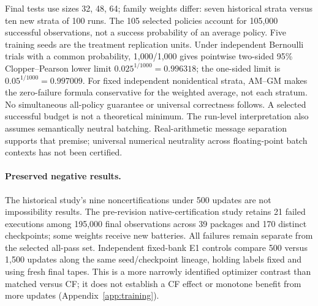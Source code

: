 \documentclass[10pt]{article}
\begin{document}
Final tests use sizes 32, 48, 64; family weights differ: seven historical
strata versus ten new strata of 100 runs. The 105 selected policies account
for 105,000 successful observations, not a success probability of an average
policy. Five training seeds are the treatment replication units.
Under independent Bernoulli trials with a common probability, 1,000/1,000
gives pointwise two-sided 95\% Clopper--Pearson lower limit \citep{clopper1934use}
$0.025^{1/1000}=0.996318$; the one-sided limit is
$0.05^{1/1000}=0.997009$. For fixed independent nonidentical strata, AM--GM
makes the zero-failure formula conservative for the weighted average, not
each stratum. No simultaneous all-policy guarantee or universal correctness
follows. A selected successful budget is not a theoretical minimum.
The run-level interpretation also assumes semantically neutral batching.
Real-arithmetic message separation supports that premise; universal numerical
neutrality across floating-point batch contexts has not been certified.

\paragraph{Preserved negative results.}
The historical study's nine noncertifications under 500 updates are not
impossibility results. The pre-revision native-certification study retains
21 failed executions among
195,000 final observations across 39 packages and 170 distinct checkpoints;
some weights receive new batteries. All failures remain separate from the
selected all-pass set. Independent fixed-bank E1 controls compare 500 versus
1,500 updates along the same seed/checkpoint lineage, holding labels fixed
and using fresh final tapes. This is a more narrowly identified optimizer
contrast than matched versus CF; it does not establish a CF effect or
monotone benefit from more updates (Appendix~\ref{app:training}).
\end{document}
